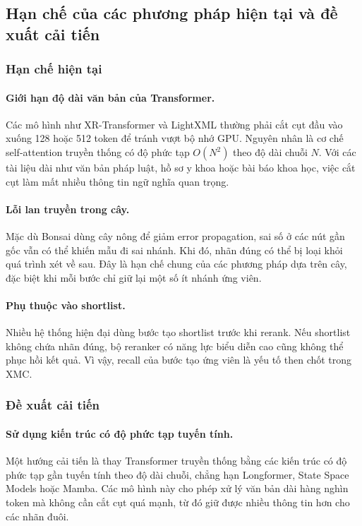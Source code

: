 \begin{expandbox}
\subsection{Hạn chế của các phương pháp hiện tại và đề xuất cải tiến}

\subsubsection{Hạn chế hiện tại}

\paragraph{Giới hạn độ dài văn bản của Transformer.}
Các mô hình như XR-Transformer và LightXML thường phải cắt cụt đầu vào xuống 128 hoặc 512 token để tránh vượt bộ nhớ GPU. Nguyên nhân là cơ chế self-attention truyền thống có độ phức tạp $O(N^2)$ theo độ dài chuỗi $N$. Với các tài liệu dài như văn bản pháp luật, hồ sơ y khoa hoặc bài báo khoa học, việc cắt cụt làm mất nhiều thông tin ngữ nghĩa quan trọng.

\paragraph{Lỗi lan truyền trong cây.}
Mặc dù Bonsai dùng cây nông để giảm error propagation, sai số ở các nút gần gốc vẫn có thể khiến mẫu đi sai nhánh. Khi đó, nhãn đúng có thể bị loại khỏi quá trình xét về sau. Đây là hạn chế chung của các phương pháp dựa trên cây, đặc biệt khi mỗi bước chỉ giữ lại một số ít nhánh ứng viên.

\paragraph{Phụ thuộc vào shortlist.}
Nhiều hệ thống hiện đại dùng bước tạo shortlist trước khi rerank. Nếu shortlist không chứa nhãn đúng, bộ reranker có năng lực biểu diễn cao cũng không thể phục hồi kết quả. Vì vậy, recall của bước tạo ứng viên là yếu tố then chốt trong XMC.

\subsubsection{Đề xuất cải tiến}

\paragraph{Sử dụng kiến trúc có độ phức tạp tuyến tính.}
Một hướng cải tiến là thay Transformer truyền thống bằng các kiến trúc có độ phức tạp gần tuyến tính theo độ dài chuỗi, chẳng hạn Longformer, State Space Models hoặc Mamba. Các mô hình này cho phép xử lý văn bản dài hàng nghìn token mà không cần cắt cụt quá mạnh, từ đó giữ được nhiều thông tin hơn cho các nhãn đuôi.


\end{expandbox}

